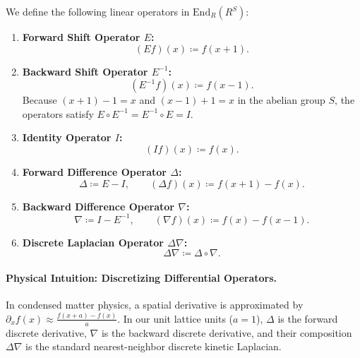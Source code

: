 \begin{definition}
We define the following linear operators in $\mathrm{End}_R(R^S)$:
\begin{enumerate}
    \item \textbf{Forward Shift Operator $E$:}
    \begin{equation}
    (E f)(x) \coloneqq f(x+1).
    \end{equation}
    \item \textbf{Backward Shift Operator $E^{-1}$:}
    \begin{equation}
    (E^{-1} f)(x) \coloneqq f(x-1).
    \end{equation}
    Because $(x+1)-1 = x$ and $(x-1)+1 = x$ in the abelian group $S$, the operators satisfy $E \circ E^{-1} = E^{-1} \circ E = I$.
    \item \textbf{Identity Operator $I$:}
    \begin{equation}
    (I f)(x) \coloneqq f(x).
    \end{equation}
    \item \textbf{Forward Difference Operator $\Delta$:}
    \begin{equation}
    \Delta \coloneqq E - I, \qquad (\Delta f)(x) \coloneqq f(x+1) - f(x).
    \end{equation}
    \item \textbf{Backward Difference Operator $\nabla$:}
    \begin{equation}
    \nabla \coloneqq I - E^{-1}, \qquad (\nabla f)(x) \coloneqq f(x) - f(x-1).
    \end{equation}
    \item \textbf{Discrete Laplacian Operator $\Delta\nabla$:}
    \begin{equation}
    \Delta\nabla \coloneqq \Delta \circ \nabla.
    \end{equation}
\end{enumerate}
\end{definition}

\paragraph{Physical Intuition: Discretizing Differential Operators.}
In condensed matter physics, a spatial derivative is approximated by $\partial_x f(x) \approx \frac{f(x+a) - f(x)}{a}$. In our unit lattice units ($a = 1$), $\Delta$ is the forward discrete derivative, $\nabla$ is the backward discrete derivative, and their composition $\Delta\nabla$ is the standard nearest-neighbor discrete kinetic Laplacian.

